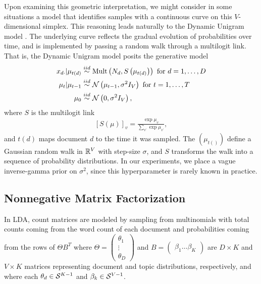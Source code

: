 \documentclass{article}
\begin{document}
Upon examining this geometric interpretation, we might consider in some
situations a model that identifies samples with a continuous curve on this
$V$-dimensional simplex. This reasoning leads naturally to the Dynamic
Unigram model \citep{blei2006dynamic}. The underlying curve reflects the gradual evolution
of probabilities over time, and is implemented by passing a random walk through
a multilogit link. That is, the Dynamic Unigram model posits the generative
model
\begin{align*}
x_{d\cdot} \vert \mu_{t\left(d\right)}  &\overset{iid}{\sim} \textnormal{Mult}\left(N_{d}, S\left(\mu_{t\left(d\right)}\right)\right) \text{ for } d = 1, \dots, D\\
\mu_{t} \vert \mu_{t - 1} &\overset{iid}{\sim} \mathcal{N}\left(\mu_{t - 1}, \sigma^{2}I_{V}\right) \text{ for } t = 1, \dots, T \\
\mu_{0} &\overset{iid}{\sim} \mathcal{N}\left(0, \sigma^{2}I_{V}\right),
\end{align*}
where $S$ is the multilogit link
\begin{align*}
\left[S\left(\mu\right)\right]_{v} = \frac{\exp{\mu_{v}}}{\sum_{v^{\prime}} \exp{\mu_{v^{\prime}}}},
\end{align*}
and $t\left(d\right)$ maps document $d$ to the time it was sampled. The
$\left(\mu_{t\left(\right)}\right)$ define a Gaussian random walk in
$\mathbb{R}^{V}$ with step-size $\sigma$, and $S$ transforms the walk into a
sequence of probability distributions. In our experiments, we place a vague
inverse-gamma prior on $\sigma^{2}$, since this hyperparameter is rarely known
in practice.

\subsection{Nonnegative Matrix Factorization}
\label{sec:nmf}

In LDA, count matrices are modeled by sampling from multinomials with total
counts coming from the word count of each document and probabilities
coming from the rows of $\Theta B^{T}$ where $\Theta = \begin{pmatrix}\theta_{1}
  \\ \vdots \\ \theta_{D} \end{pmatrix}$ and $B = \begin{pmatrix} \beta_{1}
  \dots \beta_{K} \end{pmatrix}$ are $D \times K$ and $V \times K$ matrices
representing document and topic distributions, respectively, and where each
$\theta_{d} \in \mathcal{S}^{K - 1}$ and $\beta_{k} \in \mathcal{S}^{V - 1}$.
\end{document}
